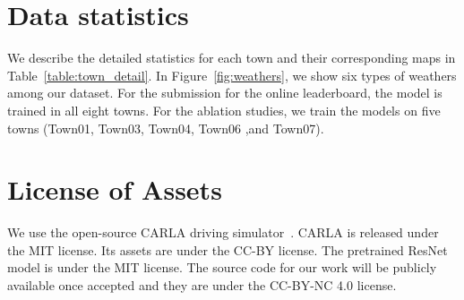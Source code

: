 \documentclass[10pt,twocolumn,letterpaper]{article}
\begin{document}
\section{Data statistics}
We describe the detailed statistics for each town and their corresponding maps in Table~\ref{table:town_detail}. In Figure~\ref{fig:weathers}, we show six types of weathers among our dataset. For the submission for the online leaderboard, the model is trained in all eight towns. For the ablation studies, we train the models on five towns (Town01, Town03, Town04, Town06 ,and Town07).




\begin{table*}[h]
\centering
{}
\caption{Detailed statistics of the number of frames and a brief description of each town.}
\label{table:town_detail}
\end{table*}




\section{License of Assets}
We use the open-source CARLA driving simulator~\cite{dosovitskiy2017carla}.
CARLA is released under the MIT license. Its assets are under the CC-BY license.
The pretrained ResNet model is under the MIT license.
The source code for our work will be publicly available once accepted and they are under the CC-BY-NC 4.0 license.
\end{document}
